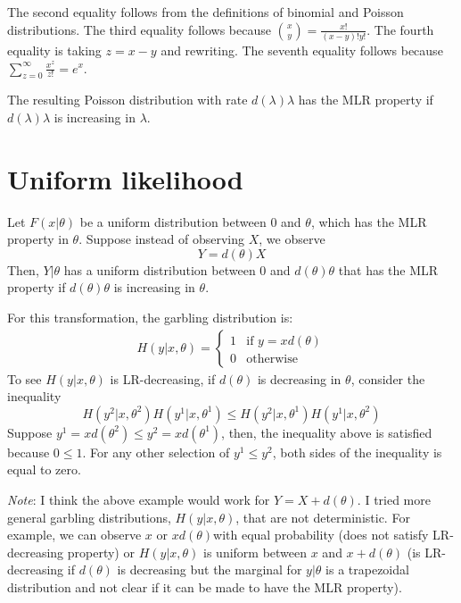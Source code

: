 \documentclass[11pt,onecolumn]{article}
\theoremstyle{plain}
\begin{document}
The second equality follows from the definitions of binomial and Poisson distributions. The third equality follows because ${x \choose y}=\frac{x!}{(x-y)!y!}$. The fourth equality is taking $z=x-y$ and rewriting. The seventh equality follows because $\sum_{z=0}^\infty \frac{x^{z}}{z!}=e^x$.

The resulting Poisson distribution with rate $d(\lambda)\lambda$ has the MLR property if $d(\lambda)\lambda$ is increasing in $\lambda$.

\section{Uniform likelihood}
Let $F(x|\theta)$ be a uniform distribution between 0 and $\theta$, which has the MLR property in $\theta$. Suppose instead of observing $X$, we observe
\begin{equation}
  Y=d(\theta)X
\end{equation}
Then, $Y|\theta$ has a uniform distribution between 0 and $d(\theta)\theta$ that has the MLR property if  $d(\theta)\theta$ is increasing in $\theta$.

For this transformation, the garbling distribution is:
\begin{align}
    H(y|x,\theta)=\left\{ \begin{array}{cc}
        1 & \mbox{if } y=xd(\theta)\\
        0 &  \mbox{otherwise}
        \end{array}\right.
\end{align}
To see  $H(y|x,\theta)$ is LR-decreasing, if $d(\theta)$ is decreasing in $\theta$, consider the inequality
\begin{equation}
 H(y^2|x,\theta^2)H(y^1|x,\theta^1) \leq H(y^2|x,\theta^1)H(y^1|x,\theta^2)
\end{equation}
Suppose $y^1=x d(\theta^2)\leq y^2=x d(\theta^1)$, then, the inequality above is satisfied because $0\leq 1$. For any other selection of $y^1\leq y^2$, both sides of the inequality is equal to zero.

\emph{Note}: I think the above example would work for $Y=X+d(\theta)$. I tried more general garbling distributions,   $H(y|x,\theta)$, that are not deterministic. For example, we can observe $x$ or $x d(\theta) $with equal probability (does not satisfy LR-decreasing property) or $H(y|x,\theta)$ is uniform between $x$ and $x+d(\theta)$ (is LR-decreasing if $d(\theta)$ is decreasing but the marginal for $y|\theta$ is a trapezoidal distribution and not clear if it can be made to have the MLR property).




\end{document}
